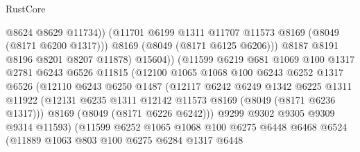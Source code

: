 \begin{lexlean}{RustCore}
\begin{coremodule}
                                    @8624
                                    @8629
                                    @11734))
                                (@11701 @6199 @1311 @11707 @11573 @8169 (@8049 (@8171 @6200 @1317)))
                                @8169
                                (@8049 (@8171 @6125 @6206)))
                              @8187
                              @8191
                              @8196
                              @8201
                              @8207
                              @11878)
                            @15604))
                        (@11599
                          @6219
                          @681
                          @1069
                          @100
                          @1317
                          @2781
                          @6243
                          @6526
                          @11815
                          (@12100
                            @1065
                            @1068
                            @100
                            @6243
                            @6252
                            @1317
                            @6526
                            (@12110
                              @6243
                              @6250
                              @1487
                              (@12117
                                @6242
                                @6249
                                @1342
                                @6225
                                @1311
                                @11922
                                (@12131 @6235 @1311 @12142 @11573 @8169 (@8049 (@8171 @6236 @1317)))
                                @8169
                                (@8049 (@8171 @6226 @6242)))
                              @9299
                              @9302
                              @9305
                              @9309
                              @9314
                              @11593)
                            (@11599
                              @6252
                              @1065
                              @1068
                              @100
                              @6275
                              @6448
                              @6468
                              @6524
                              (@11889
                                @1063
                                @803
                                @100
                                @6275
                                @6284
                                @1317
                                @6448

\end{coremodule}
\end{lexlean}
